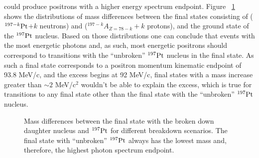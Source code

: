 \documentclass[12pt]{article}
\begin{document}
could produce positrons with a higher energy spectrum endpoint.
Figure ~\ref{fig:pt197_dmass} shows the distributions of mass differences
between the final states consisting of ($^{197-k} \rm Pt$$ + k$ neutrons) and 
($^{197-k}A_{Z=78-k} + k$ protons),
and the ground state of the $^{197} \rm Pt$ nucleus.
Based on those distributions one can conclude that events with the most energetic photons
and, as such, most energetic positrons should correspond to transitions with the ``unbroken''
$^{197} \rm Pt$ nucleus in the final state.
As such a final state corresponds to a positron momentum kinematic endpoint of 93.8 MeV/c,
and the excess begins at 92 MeV/c, final states with a mass increase greater
than $\sim 2$ MeV/c$^2$ wouldn't be able to explain the excess, which is true for
transitions to any final state other than the final state with the ``unbroken'' $^{197} \rm Pt$
nucleus.

\begin{figure}
  \caption{
    \label{fig:pt197_dmass}
    Mass differences between the final state with the broken down daughter nucleus
    and $^{197} \rm Pt$ for different breakdown scenarios.
    The final state with ``unbroken'' $^{197} \rm Pt$ always has the lowest mass and,
    therefore, the highest photon spectrum endpoint.
  }
\end{figure}
\end{document}
